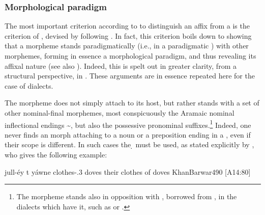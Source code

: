 \subsubsection{Morphological paradigm} \label{ss:morph_paradigm}

The most important criterion according to \citet[627]{SamvelianEzafe} to distinguish an affix from a  is the criterion of , devised by \citet{Miller} following \citet{ZwickySupressing}. In fact, this criterion boils down to showing that a morpheme stands paradigmatically  (i.e., in a paradigmatic ) with other morphemes, forming in essence a morphological paradigm, and thus revealing its affixal nature (see also ). Indeed, this is spelt out in greater clarity, from a structural perspective, in \citet{SamvelianHead}. These arguments are in essence repeated here for the case of  dialects.

 The \ed morpheme does not simply attach to its host,   but rather stands  with a set of other nominal-final morphemes, most conspicuously the Aramaic nominal inflectional endings \~, but also the possessive pronominal suffixes.\footnote{The \ed morpheme stands also in opposition with   , borrowed from \Sor, in the dialects which have it, such as \JKoy or \JSul \parencites[62]{MutzafiKoySanjaq}[232]{KhanSulemaniyya}.}  Indeed, one never finds an \ed morph attaching to a noun or a preposition ending in a , even if their scope is different. In such cases the \d {} must be used, as stated explicitly by \citet[490]{KhanBarwar}, who gives the following example:
 
 {jull-éy t\cb{} yáwne}
 {clothes-\poss.3\pl{} \lnk\cb{} doves}
 {their clothes of doves}
 {KhanBarwar}{490 {[A14:80]} }
 

